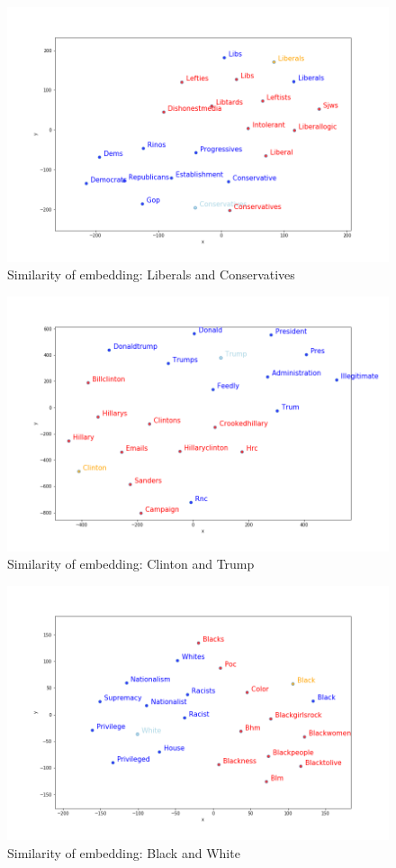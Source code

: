 \documentclass[12pt, authoryear]{elsarticle}
\begin{document}
\begin{figure}[H]
\includegraphics[width=6in]{embedding_liberals_conservatives}
\centering
\caption{Similarity of embedding: Liberals and Conservatives}
\label{embedding:1}
\end{figure}

\begin{figure}[H]
\includegraphics[width=6in]{embedding_clinton_trump}
\centering
\caption{Similarity of embedding: Clinton and Trump}
\label{embedding:2}
\end{figure}

\begin{figure}[H]
\includegraphics[width=6in]{embedding_black_white}
\centering
\caption{Similarity of embedding: Black and White}
\label{embedding:3}
\end{figure}
\end{document}
